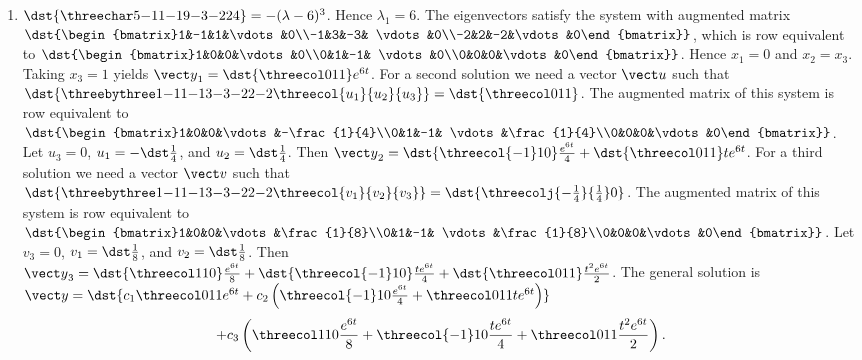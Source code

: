 \documentclass[openany]{book}
\newenvironment{sectionSolutions}{
 \begin{enumerate}[item-label={\thesection.\arabic{enumi}.}]
}{
 \end{enumerate}
}
\begin{document}
\begin{sectionSolutions}
\item
$\dst{\threechar5{-1}1{-1}9{-3}{-2}24}
=-(\lambda-6)^3$.
Hence $\lambda_1=6$. The eigenvectors
 satisfy the system with  augmented matrix
$\dst{\begin{bmatrix}1&-1&1&\vdots&0\\-1&3&-3&
\vdots&0\\-2&2&-2&\vdots&0\end{bmatrix}}$,
which is row equivalent to
$\dst{\begin{bmatrix}1&0&0&\vdots&0\\0&1&-1&
\vdots&0\\0&0&0&\vdots&0\end{bmatrix}}$.
Hence  $x_1=0$ and $x_2=x_3$.  Taking $x_3=1$
yields
${\vect y}_1=\dst{\threecol011}e^{6t}$.
For a second solution we need a vector ${\vect u}$ such that
$\dst{\threebythree1{-1}1{-1}3{-3}{-2}2{-2}\threecol{u_1}{u_2}{u_3}}
=\dst{\threecol011}$.
The augmented matrix of this system is row equivalent to
$\dst{\begin{bmatrix}1&0&0&\vdots&-\frac{1}{4}\\0&1&-1&
\vdots&\frac{1}{4}\\0&0&0&\vdots&0\end{bmatrix}}$.
Let $u_3=0$, $u_1=-\dst\frac{1}{4}$, and $u_2=\dst\frac{1}{4}$. Then ${\vect
y}_2=\dst{\threecol{-1}10}\frac{e^{6t}}{4}+\dst{\threecol011}te^{6t}$.
For a third solution we need a vector ${\vect v}$ such that
$\dst{\threebythree1{-1}1{-1}3{-3}{-2}2{-2}\threecol{v_1}{v_2}{v_3}}
=\dst{\threecolj{-\frac{1}{4}}{\frac{1}{4}}0}$.
The augmented matrix of this system is row equivalent to
$\dst{\begin{bmatrix}1&0&0&\vdots&\frac{1}{8}\\0&1&-1&
\vdots&\frac{1}{8}\\0&0&0&\vdots&0\end{bmatrix}}$.
Let $v_3=0$, $v_1=\dst\frac{1}{8}$, and $v_2=\dst\frac{1}{8}$. Then
${\vect y}_3= \dst{\threecol110}\frac{e^{6t}}{8}+
\dst{\threecol{-1}10}\frac{te^{6t}}{4}+\dst{\threecol011}\frac{t^2e^{6t}}{2}$.
The general solution is
${\vect y}=\dst{c_1\threecol011e^{6t}+
c_2\left(\threecol{-1}10\frac{e^{6t}}{4}+\threecol011te^{6t}\right)}$
\[+c_3\left(\threecol110\frac{e^{6t}}{8}+\threecol{-1}10\frac{t
e^{6t}}{4}+\threecol011\frac{t^2e^{6t}}{2}\right).\]



\end{sectionSolutions}
\end{document}
